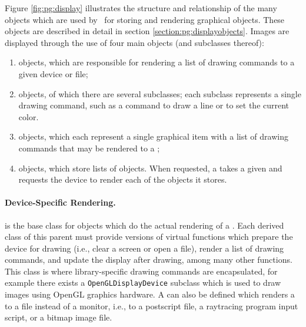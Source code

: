 Figure \ref{fig:pg:display} illustrates the structure and relationship of the many objects which are used by \VMD\ for storing and rendering graphical objects.  These objects are described in detail in section \ref{section:pg:displayobjects}.  Images are displayed through the use of four main objects (and subclasses thereof):
\begin{enumerate}
  \item {} objects, which are responsible for rendering a list of drawing commands to a given device or file;
  \item {} objects, of which there are several subclasses; each  subclass represents a single drawing command, such as a command to draw a line or to set the current color.
  \item {} objects, which each represent a single graphical item with a list of drawing commands that may be rendered to a ;
  \item {} objects, which store lists of  objects.  When requested, a  takes a given  and requests the device to render each of the  objects it stores.
\end{enumerate}

\begin{centering}
\end{centering}

\paragraph{Device-Specific Rendering.}
 is the base class for objects which do the actual rendering of a .  Each derived class of this parent must provide versions of virtual functions which prepare the device for drawing (i.e., clear a screen or open a file), render a list of drawing commands, and update the display after drawing, among many other functions.  This class is where library-specific drawing commands are encapsulated, for example there exists a {\tt OpenGLDisplayDevice} subclass which is used to draw images using OpenGL graphics hardware.  
A  can also be defined which renders a  to a file instead of a monitor, i.e., to a postscript file, a raytracing program input script, or a bitmap image file.

